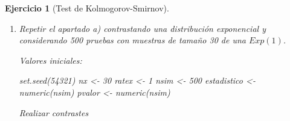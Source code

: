 \documentclass[
]{book}
\newenvironment{Shaded}{\begin{snugshade}}{\end{snugshade}}
\newcommand{\AttributeTok}[1]{\textcolor[rgb]{0.77,0.63,0.00}{#1}}
\newcommand{\CommentTok}[1]{\textcolor[rgb]{0.56,0.35,0.01}{\textit{#1}}}
\newcommand{\DecValTok}[1]{\textcolor[rgb]{0.00,0.00,0.81}{#1}}
\newcommand{\FunctionTok}[1]{\textcolor[rgb]{0.00,0.00,0.00}{#1}}
\newcommand{\NormalTok}[1]{#1}
\newcommand{\OtherTok}[1]{\textcolor[rgb]{0.56,0.35,0.01}{#1}}
\newcommand{\StringTok}[1]{\textcolor[rgb]{0.31,0.60,0.02}{#1}}
\theoremstyle{break}
\newtheorem{exercise}{Ejercicio}[chapter]
\theoremstyle{nonumberplain}
\renewcommand{\CommentTok}[1]{\textcolor[rgb]{0.41,0.41,0.41}{\texttt{#1}}}
\begin{document}
\begin{exercise}[Test de Kolmogorov-Smirnov]
\begin{enumerate}
  \begin{center}\texttt{[image: 07-Monte\_Carlo\_files/figure-latex/unnamed-chunk-52-1]} \end{center}

\begin{Shaded}
\begin{Highlighting}[]
\CommentTok{\# Distribución empírica}
\FunctionTok{curve}\NormalTok{(}\FunctionTok{ecdf}\NormalTok{(pvalor)(x), }\AttributeTok{type =} \StringTok{"s"}\NormalTok{, }\AttributeTok{lwd =} \DecValTok{2}\NormalTok{, }\AttributeTok{main =} \StringTok{\textquotesingle{}Tamaño del contraste\textquotesingle{}}\NormalTok{, }
      \AttributeTok{ylab =} \StringTok{\textquotesingle{}Proporción de rechazos\textquotesingle{}}\NormalTok{, }\AttributeTok{xlab =} \StringTok{\textquotesingle{}Nivel de significación\textquotesingle{}}\NormalTok{)}
\FunctionTok{abline}\NormalTok{(}\AttributeTok{a=}\DecValTok{0}\NormalTok{, }\AttributeTok{b=}\DecValTok{1}\NormalTok{, }\AttributeTok{lty=}\DecValTok{2}\NormalTok{)   }\CommentTok{\# curve(punif(x, 0, 1), add = TRUE)}
\end{Highlighting}
\end{Shaded}

  \begin{center}\texttt{[image: 07-Monte\_Carlo\_files/figure-latex/unnamed-chunk-52-2]} \end{center}
\item
  Repetir el apartado a) contrastando una distribución exponencial
  y considerando 500 pruebas con muestras de tamaño 30 de una \(Exp(1)\).

  Valores iniciales:

\begin{Shaded}
\begin{Highlighting}[]
\FunctionTok{set.seed}\NormalTok{(}\DecValTok{54321}\NormalTok{)}
\NormalTok{nx }\OtherTok{\textless{}{-}} \DecValTok{30}
\NormalTok{ratex }\OtherTok{\textless{}{-}} \DecValTok{1}
\NormalTok{nsim }\OtherTok{\textless{}{-}} \DecValTok{500}
\NormalTok{estadistico }\OtherTok{\textless{}{-}} \FunctionTok{numeric}\NormalTok{(nsim)}
\NormalTok{pvalor }\OtherTok{\textless{}{-}} \FunctionTok{numeric}\NormalTok{(nsim)}
\end{Highlighting}
\end{Shaded}

  Realizar contrastes


\end{enumerate}
\end{exercise}
\end{document}
